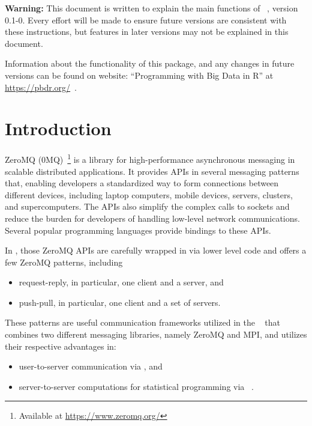 
{\color{red} \bf Warning:}
This document is written to explain the main functions of 
~\citep{Chen2015}, version 0.1-0.  Every effort will be made to 
ensure future versions are consistent with these instructions, but features in 
later versions may not be explained in this document.

Information about the functionality of this package,
and any changes in future versions can be found on website:
``Programming with Big Data in R'' at
\url{https://pbdr.org/}~\citep{pbdR2012}.




\section[Introduction]{Introduction}
\label{sec:introduction}


ZeroMQ (0MQ)~\citep{hintjens2013zeromq}\footnote{Available at 
\url{https://www.zeromq.org/}} is a library for high-performance
asynchronous messaging in scalable distributed applications. It provides
APIs in several messaging patterns that, enabling developers a standardized 
way to form connections between different devices, including laptop computers, 
mobile devices, servers, clusters, and supercomputers. The APIs also simplify 
the complex calls to sockets and reduce the burden for developers of handling
low-level network communications.  Several popular programming languages 
provide bindings to these APIs.

In , those ZeroMQ APIs are carefully wrapped in 
via lower level  code and offers a few ZeroMQ patterns, including
\begin{itemize}
\item request-reply, in particular, one client and a server, and
\item push-pull, in particular, one client and a set of servers.
\end{itemize}
These patterns are useful communication frameworks utilized in the
~\citep{Schmidt2015} that combines two different messaging 
libraries, namely ZeroMQ and MPI, and utilizes their respective advantages in:
\begin{itemize}
\item user-to-server communication via , and
\item server-to-server computations for statistical programming  
via ~\citep{Chen2012}.
\end{itemize}
